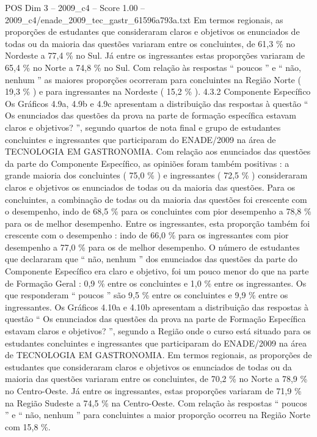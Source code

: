 \begin{textsample}{POS Dim 3 – 2009\_c4 – Score 1.00 – 2009\_c4/enade\_2009\_tec\_gastr\_61596a793a.txt}
Em termos regionais, as proporções de estudantes que consideraram claros e objetivos os enunciados de todas ou da maioria das questões variaram entre os concluintes, de 61,3 \% no Nordeste a 77,4 \% no Sul.
Já entre os ingressantes estas proporções variaram de 65,4 \% no Norte a 74,8 \% no Sul.
Com relação às respostas “ poucos ” e “ não, nenhum ” as maiores proporções ocorreram para concluintes na Região Norte ( 19,3 \% ) e para ingressantes na Nordeste ( 15,2 \% ). 4.3.2 Componente Específico Os Gráficos 4.9a, 4.9b e 4.9c apresentam a distribuição das respostas à questão “ Os enunciados das questões da prova na parte de formação específica estavam claros e objetivos? ”, segundo quartos de nota final e grupo de estudantes concluintes e ingressantes que participaram do ENADE/2009 na área de TECNOLOGIA EM GASTRONOMIA.
Com relação aos enunciados das questões da parte do Componente Específico, as opiniões foram também positivas : a grande maioria dos concluintes ( 75,0 \% ) e ingressantes ( 72,5 \% ) consideraram claros e objetivos os enunciados de todas ou da maioria das questões.
Para os concluintes, a combinação de todas ou da maioria das questões foi crescente com o desempenho, indo de 68,5 \% para os concluintes com pior desempenho a 78,8 \% para os de melhor desempenho.
Entre os ingressantes, esta proporção também foi crescente com o desempenho : indo de 66,0 \% para os ingressantes com pior desempenho a 77,0 \% para os de melhor desempenho.
O número de estudantes que declararam que “ não, nenhum ” dos enunciados das questões da parte do Componente Específico era claro e objetivo, foi um pouco menor do que na parte de Formação Geral : 0,9 \% entre os concluintes e 1,0 \% entre os ingressantes.
Os que responderam “ poucos ” são 9,5 \% entre os concluintes e 9,9 \% entre os ingressantes.
Os Gráficos 4.10a e 4.10b apresentam a distribuição das respostas à questão “ Os enunciados das questões da prova na parte de Formação Específica estavam claros e objetivos? ”, segundo a Região onde o curso está situado para os estudantes concluintes e ingressantes que participaram do ENADE/2009 na área de TECNOLOGIA EM GASTRONOMIA.
Em termos regionais, as proporções de estudantes que consideraram claros e objetivos os enunciados de todas ou da maioria das questões variaram entre os concluintes, de 70,2 \% no Norte a 78,9 \% no Centro-Oeste.
Já entre os ingressantes, estas proporções variaram de 71,9 \% na Região Sudeste a 74,5 \% na Centro-Oeste.
Com relação às respostas “ poucos ” e “ não, nenhum ” para concluintes a maior proporção ocorreu na Região Norte com 15,8 \%.

\end{textsample}
